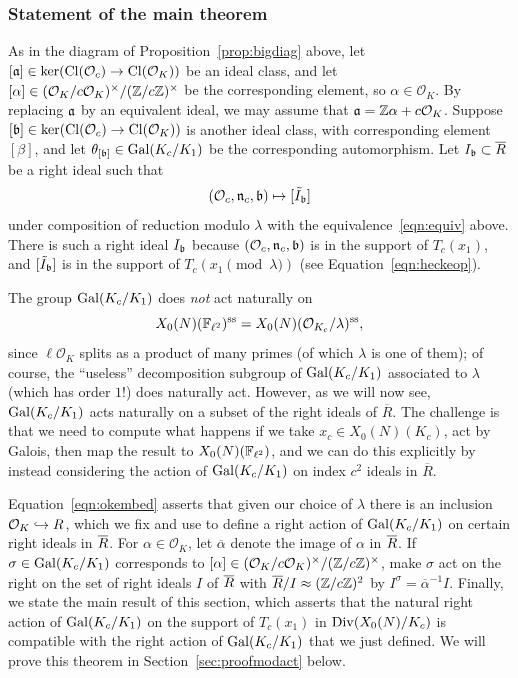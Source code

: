 \documentclass{article} \usepackage[active]{srcltx}
\newcommand{\Oc}{\mathcal{O}_c}
\newcommand{\OK}{\mathcal{O}_K}
\newcommand{\n}{\mathfrak{n}}
\renewcommand{\O}{\mathcal{O}}
\DeclareMathOperator{\supersingular}{ss}
\renewcommand{\ss}{\supersingular}
\begin{document}
\subsubsection{Statement of the main theorem}\label{sec:statement}
As in the diagram of Proposition~\ref{prop:bigdiag} above, let
$[\fa] \in \ker(\Cl(\Oc)\to \Cl(\OK))$ be an ideal class, and let
$[\alpha] \in (\OK/c\OK)^{\times}/(\Z/c\Z)^{\times}$ be the corresponding element,
so $\alpha \in \OK$. By replacing $\mathfrak{a}$ by an equivalent ideal, we
may assume that $\fa = \Z\alpha + c\OK$.  Suppose $[\fb] \in
\ker(\Cl(\Oc)\to \Cl(\OK))$ is another ideal class, with corresponding
element $[\beta]$, and let $\theta_{[\mathfrak{b}]} \in \operatorname{Gal}(K_c/K_1)$ be the 
corresponding automorphism.  Let
$I_{\mathfrak{b}}\subset \overline{R}$ be a right ideal such that
\begin{equation}\label{eqn:icorr}
  (\Oc, \n_c, \fb) \mapsto [\tilde{I}_{\fb}]
\end{equation}
under composition of reduction modulo $\lambda$ with the 
equivalence~\eqref{eqn:equiv} above.  There is such a right ideal $I_{\mathfrak{b}}$ 
because $(\Oc, \n_c, \fb)$ is in the support of $T_c(x_1)$, and
$[\tilde{I}_{\mathfrak{b}}]$ is in the support of $T_c(x_1\pmod{\lambda})$
(see Equation~\eqref{eqn:heckeop}).

The group $\operatorname{Gal}(K_c/K_1)$ does {\em not} act naturally on
$$
 X_0(N)(\F_{\ell^2})^{\ss} = X_0(N)(\O_{K_c}/\lambda)^{\ss},
$$ 
since $\ell \O_K$ splits as a product of many primes (of which
$\lambda$ is one of them); of course, the ``useless''
decomposition subgroup  of $\operatorname{Gal}(K_c/K_1)$ associated to
$\lambda$ (which has order $1$!) does naturally act.  
However, as we will
now see, $\operatorname{Gal}(K_c/K_1)$ acts naturally on a subset of the right
ideals of $\overline{R}$. 
The challenge is that we need to compute
what happens if we take  $x_c \in X_0(N)(K_c)$, 
act by Galois, then map the result to $X_0(N)(\mathbb{F}_{\ell^2})$,
and we can do this explicitly by instead 
considering the action of $\operatorname{Gal}(K_c/K_1)$
on index $c^2$ ideals in $\overline{R}$.

Equation~\eqref{eqn:okembed} asserts that given our choice of
$\lambda$ there is an inclusion $\OK \hra R$, which we fix and use to
define a right action of $\operatorname{Gal}(K_c/K_1)$ on certain right ideals in
$\overline{R}$.  For $\alpha\in\OK$, let $\overline{\alpha}$ denote the image
of $\alpha$ in $\overline{R}$.  If $\sigma \in \operatorname{Gal}(K_c/K_1)$ corresponds to
$[\alpha]\in (\OK/c\OK)^{\times}/(\Z/c\Z)^{\times}$, make $\sigma$ act
on the right on the set of right ideals $I$ of $\overline{R}$ with
$\overline{R}/I\approx (\mathbb{Z}/c\mathbb{Z})^2$ by $I^{\sigma} = \overline{\alpha}^{-1}
I$.  Finally, we state the main result of this section, which asserts
that the natural right action of $\operatorname{Gal}(K_c/K_1)$ on the support of
$T_c(x_1)$ in $\operatorname{Div}(X_0(N)/K_c)$ is compatible with the right action
of $\operatorname{Gal}(K_c/K_1)$ that we just defined. We will prove this theorem in
Section~\ref{sec:proofmodact} below.
\end{document}
